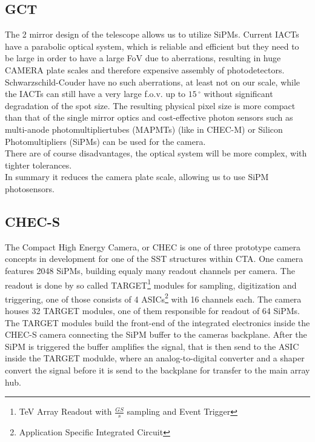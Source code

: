 \documentclass[12pt,article,type=msc,colorback,accentcolor=tud9c]{tudthesis}
\begin{document}
\subsection{GCT}

\begin{figure}[t]
\begin{centering}
}
\caption{Schwarzschild-Couder Optics, If possible replace picture with GCT with mounted CHEC camera picture here}
\label{fig:SCO}
\end{centering}
\end{figure}


The 2 mirror design of the telescope allows us to utilize SiPMs. Current IACTs have a parabolic optical system, which is reliable and efficient but they need to be large in order to have a large FoV due to aberrations, resulting in huge CAMERA plate scales and therefore expensive assembly of photodetectors.\\

Schwarzschild-Couder have no such aberrations, at least not on our scale, while the IACTs can still have a very large f.o.v. up to $15\,^{\circ}$ without significant degradation of the spot size. The resulting physical pixel size is more compact than that of the single mirror optics and cost-effective  photon sensors such as multi-anode photomultipliertubes (MAPMTs) (like in CHEC-M) or Silicon Photomultipliers (SiPMs) can be used for the camera.\\
There are of course disadvantages, the optical system will be more complex, with tighter tolerances.\\

In summary it reduces the camera plate scale, allowing us to use SiPM photosensors.

\subsection{CHEC-S}
The Compact High Energy Camera, or CHEC is one of three prototype camera concepts in development for one of the SST structures within CTA. One camera features 2048 SiPMs, building equaly many readout channels per camera. The readout is done by so called TARGET\footnote{TeV Array Readout with $\frac{GS}{s}$ sampling and Event Trigger} modules for sampling, digitization and triggering, one of those consists of 4 ASICs\footnote{Application Specific Integrated Circuit} with 16 channels each. The camera houses 32 TARGET modules, one of them responsible for readout of 64 SiPMs. The TARGET modules build the front-end of the integrated electronics inside the CHEC-S camera connecting the SiPM buffer to the cameras backplane. After the SiPM is triggered the buffer amplifies the signal, that is then send to the ASIC inside the TARGET modulde, where an analog-to-digital converter and a shaper convert the signal before it is send to the backplane for transfer to the main array hub. 
\end{document}
